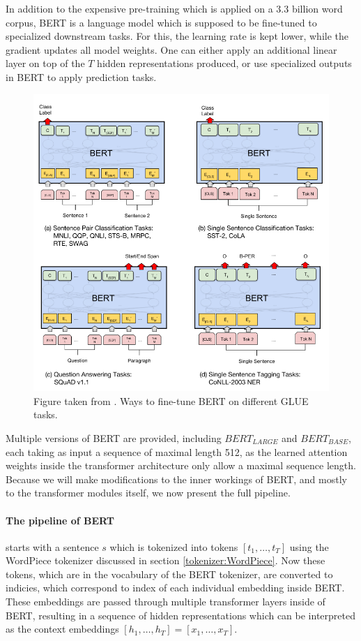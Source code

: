 \documentclass[a4paper,12pt,twoside,openright]{report}
\begin{document}
In addition to the expensive pre-training which is applied on a 3.3 billion word corpus, BERT is a language model which is supposed to be fine-tuned to specialized downstream tasks.
For this, the learning rate is kept lower, while the gradient updates all model weights.
One can either apply an additional linear layer on top of the $T$ hidden representations produced, or use specialized outputs in BERT to apply prediction tasks.

\begin{figure}[h]
	\center
  \includegraphics[width=0.8\linewidth]{./assets/background/BERT_GLUE_finetune.png}
  \caption{Figure taken from \cite{devlin18}. Ways to fine-tune BERT on different GLUE tasks.}
  \label{fig:cbow_skipgram}
\end{figure}

Multiple versions of BERT are provided, including $BERT_{LARGE}$ and $BERT_{BASE}$, each taking as input a sequence of maximal length 512, as the learned attention weights inside the transformer architecture only allow a maximal sequence length. 
Because we will make modifications to the inner workings of BERT, and mostly to the transformer modules itself, we now present the full pipeline. 

\paragraph{The pipeline of BERT} starts with a sentence $s$ which is tokenized into tokens $[t_1, \ldots, t_T]$ using the WordPiece tokenizer discussed in section \ref{tokenizer:WordPiece}.
Now these tokens, which are in the vocabulary of the BERT tokenizer, are converted to indicies, which correspond to index of each individual embedding inside BERT.
These embeddings are passed through multiple transformer layers inside of BERT, resulting in a sequence of hidden representations which can be interpreted as the context embeddings $[h_1, \ldots, h_T] = [x_1, \ldots, x_T]$.
\end{document}
